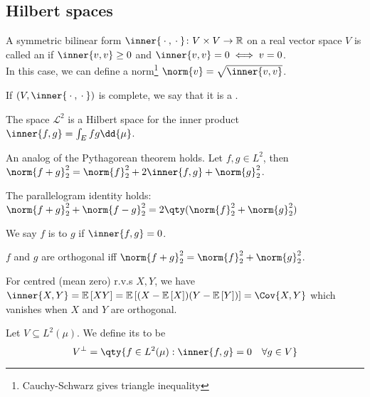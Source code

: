 \subsection{Hilbert spaces}

\begin{definition}
	A symmetric bilinear form $\inner{\wildcard, \wildcard} \colon V \times V \to \mathbb R$ on a real vector space $V$ is called an  if $\inner{v,v} \geq 0$ and $\inner{v,v} = 0 \iff v = 0$. \\
	In this case, we can define a norm\footnote{Cauchy-Schwarz gives triangle inequality} $\norm{v} = \sqrt{\inner{v,v}}$.
\end{definition}

\begin{definition}
	If $(V,\inner{\wildcard,\wildcard})$ is complete, we say that it is a .
\end{definition}

\begin{corollary}
	The space $\mathcal L^2$ is a Hilbert space for the inner product $\inner{f,g} = \int_E fg \dd{\mu}$.
\end{corollary}

\begin{example}
	An analog of the Pythagorean theorem holds.
	Let $f, g \in L^2$, then $\norm{f + g}_2^2 = \norm{f}_2^2 + 2\inner{f,g} + \norm{g}_2^2$.
\end{example}

\begin{example}
	The parallelogram identity holds: $\norm{f+g}_2^2 + \norm{f-g}_2^2 = 2 \qty(\norm{f}_2^2 + \norm{g}_2^2)$
\end{example}

\begin{definition}[Orthogonal]
	We say $f$ is  to $g$ if $\inner{f,g} = 0$.
\end{definition}

\begin{remark}
	$f$ and $g$ are orthogonal iff $\norm{f + g}_2^2 = \norm{f}_2^2 + \norm{g}_2^2$.

	For centred (mean zero) r.v.s $X, Y$, we have $\inner{X,Y} = \expect{XY} = \expect{(X - \expect{X})(Y - \expect{Y})} = \Cov{X,Y}$ which vanishes when $X$ and $Y$ are orthogonal.
\end{remark}

\begin{definition}
	Let $V \subseteq L^2(\mu)$.
	We define its  to be
	\[ V^\perp = \qty{f \in L^2(\mu) : \inner{f,g} = 0 \quad \forall g \in V} \]
\end{definition}

